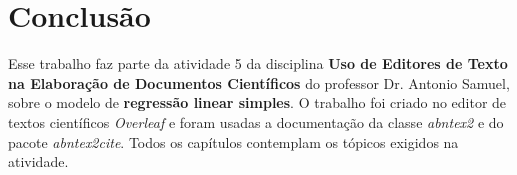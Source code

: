 \chapter{Conclusão}
\label{ch:conclusao}

\noindent Esse trabalho faz parte da atividade 5 da disciplina \textbf{Uso de Editores de Texto na Elaboração de Documentos Científicos} do professor Dr. Antonio Samuel, sobre o modelo de \textbf{regressão linear simples}. O trabalho foi criado no editor de textos científicos \textit{Overleaf} e foram usadas a documentação da classe \textit{abntex2} e do pacote \textit{abntex2cite}. Todos os capítulos contemplam os tópicos exigidos na atividade.

